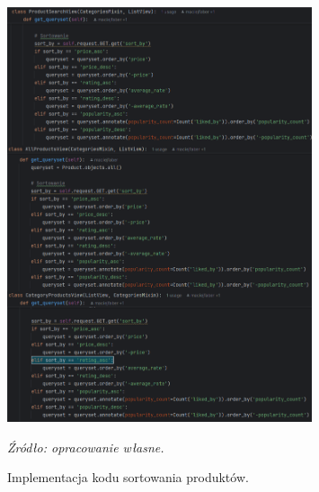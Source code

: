 \documentclass[12pt,a4paper,oneside]{article}
\theoremstyle{definition}
\numberwithin{equation}{section}
\begin{document}
\begin{figure}[H]
    \centering
    \includegraphics[width=0.8\textwidth]{images/krzysztofBImages/sorting.png}
    \caption{Implementacja kodu sortowania produktów.}
    \emph{Źródło: opracowanie własne.}
    \label{fig:sorting_products}
\end{figure}
%
%
\end{document}
